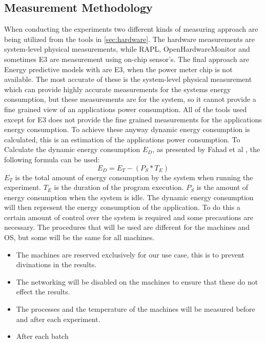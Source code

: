 \subsection{Measurement Methodology}
When conducting the experiments two different kinds of measuring approach are being utilized from the tools in \cref{sec:hardware}.
The hardware measurements are system-level physical measurements, while RAPL, OpenHardwareMonitor and sometimes E3 are measurement using on-chip sensor's. The final approach are Energy predictive models with are E3, when the power meter chip is not available. The most accurate of these is the system-level physical measurement which can provide highly accurate measurements for the systems energy consumption, but these measurements are for the system, so it cannot provide a fine grained view of an applications power consumption. All of the tools used except for E3 does not provide the fine grained measurements for the applications energy consumption. To achieve these anyway dynamic energy consumption is calculated, this is an estimation of the applications power consumption. To Calculate the dynamic energy consumption $E_D$, as presented by Fahad et al \cite{fahad2019comparative}, the following formula can be used:
$$E_D = E_T -(P_S * T_E)$$
$E_T$ is the total amount of energy consumption by the system when running the experiment. $T_E$ is the duration of the program execution. $P_S$ is the amount of energy consumption when the system is idle. The dynamic energy consumption will then represent the energy consumption of the application. To do this a certain amount of control over the system is required and some precautions are necessary. The procedures that will be used are different for the machines and OS, but some will be the same for all machines.
\begin{itemize}
    \item The machines are reserved exclusively for our use case, this is to prevent divinations in the results.
    \item The networking will be disabled on the machines to ensure that these do not effect the results.
    \item The processes and the temperature of the machines will be measured before and after each experiment.
    \item After each batch 
\end{itemize}

\cite{sestoft2013microbenchmarks} \cite{fahad2019comparative} \cite{Bokhari2020r3}